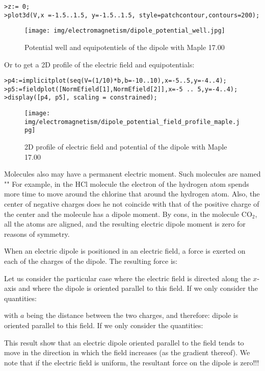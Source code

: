 	\texttt{>z:= 0;\\
	>plot3d(V,x =-1.5..1.5, y=-1.5..1.5, style=patchcontour,contours=200);
	}

	\begin{figure}[H]
		\centering
		\texttt{[image: img/electromagnetism/dipole\_potential\_well.jpg]}
		\caption{Potential well and equipotentiels of the dipole with Maple 17.00}
	\end{figure}
	Or to get a 2D profile of the electric field and equipotentials:
	
	\texttt{>p4:=implicitplot({seq(V=(1/10)*b,b=-10..10)},x=-5..5,y=-4..4);\\
	>p5:=fieldplot([NormEfield[1],NormEfield[2]],x=-5 .. 5,y=-4..4); 
	\\>display([p4, p5], scaling = constrained);\\
	}
	\begin{figure}[H]
		\centering
		\texttt{[image: img/electromagnetism/dipole\_potential\_field\_profile\_maple.jpg]}
		\caption{2D profile of electric field and potential of the dipole with Maple 17.00}
	\end{figure}
	\begin{tcolorbox}[title=Remark,colframe=black,arc=10pt]
	Molecules also may have a permanent electric moment. Such molecules are named "" For example, in the HCl molecule the electron of the hydrogen atom spends more time to move around the chlorine that around the hydrogen atom. Also, the center of negative charges does he not coincide with that of the positive charge of the center and the molecule has a dipole moment. By cons, in the molecule $\text{CO}_2$, all the atoms are aligned, and the resulting electric dipole moment is zero for reasons of symmetry.
	\end{tcolorbox}
	When an electric dipole is positioned in an electric field, a force is exerted on each of the charges of the dipole. The resulting force is:
	
	Let us consider the particular case where the electric field is directed along the $x$-axis and where the dipole is oriented parallel to this field. If we only consider the quantities:
	
	with $a$ being the distance between the two charges, and therefore:
	dipole is oriented parallel to this field. If we only consider the quantities:
	
	This result show that an electric dipole oriented parallel to the field tends to move in the direction in which the field increases (as the gradient thereof). We note that if the electric field is uniform, the resultant force on the dipole is zero!!!
	

